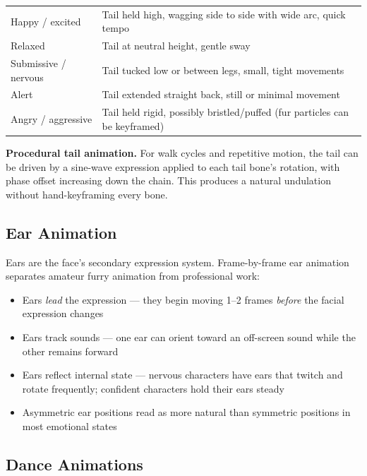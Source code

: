 \begin{center}
\begin{tabularx}{\textwidth}{L{3.5cm}X}
\toprule
{}
 &  \\
\midrule
Happy / excited & Tail held high, wagging side to side with wide arc, quick tempo \\
Relaxed & Tail at neutral height, gentle sway \\
Submissive / nervous & Tail tucked low or between legs, small, tight movements \\
Alert & Tail extended straight back, still or minimal movement \\
Angry / aggressive & Tail held rigid, possibly bristled/puffed (fur particles can be keyframed) \\
\bottomrule
\end{tabularx}
\end{center}

\textbf{Procedural tail animation.} For walk cycles and repetitive motion, the tail can be driven by a sine-wave expression applied to each tail bone's rotation, with phase offset increasing down the chain. This produces a natural undulation without hand-keyframing every bone.


\subsection{Ear Animation}

Ears are the face's secondary expression system. Frame-by-frame ear animation separates amateur furry animation from professional work:

\begin{itemize}[leftmargin=2em]
  \item Ears \emph{lead} the expression --- they begin moving 1--2 frames \emph{before} the facial expression changes
  \item Ears track sounds --- one ear can orient toward an off-screen sound while the other remains forward
  \item Ears reflect internal state --- nervous characters have ears that twitch and rotate frequently; confident characters hold their ears steady
  \item Asymmetric ear positions read as more natural than symmetric positions in most emotional states
\end{itemize}


\subsection{Dance Animations}

